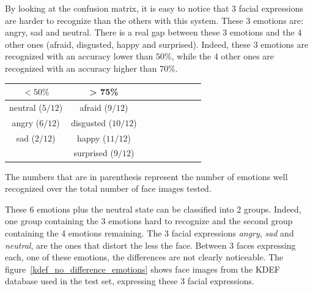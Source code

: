 \vspace{\baselineskip}
\vspace{\baselineskip}
\noindent By looking at the confusion matrix, it is easy to notice that 3 facial expressions are harder to recognize than the others with this system. These 3 emotions are: angry, sad and neutral. There is a real gap between these 3 emotions and the 4 other ones (afraid, disgusted, happy and surprised). Indeed, these 3 emotions are recognized with an accuracy lower than $ 50\% $, while the 4 other ones are recognized with an accuracy higher than $ 70\% $.
\newline

\vspace{\baselineskip}
\begin {center}
\begin{tabular}{|c|c|c|c|c|c|c|c|c|}
  \hline
   $ < 50\% $ & > 75\% \\
  \hline
  neutral ($ 5/12 $) & afraid ($ 9/12 $) \\
  angry ($ 6/12 $) & disgusted ($ 10/12 $) \\
  sad ($ 2/12 $) & happy ($ 11/12 $) \\
   & surprised ($ 9/12 $) \\
  \hline
\end{tabular}
\end {center}

\vspace{\baselineskip}
\vspace{\baselineskip}
\noindent The numbers that are in parenthesis represent the number of emotions well recognized over the total number of face images tested.
\newline

\noindent These 6 emotions plus the neutral state can be classified into 2 groups. Indeed, one group containing the 3 emotions hard to recognize and the second group containing the 4 emotions remaining. The 3 facial expressions \textit{angry}, \textit{sad} and \textit{neutral}, are the ones that distort the less the face. Between 3 faces expressing each,  one of these emotions, the differences are not clearly noticeable. The figure~\ref{kdef_no_difference_emotions} shows face images from the KDEF database used in the test set, expressing these 3 facial expressions.
\newline

